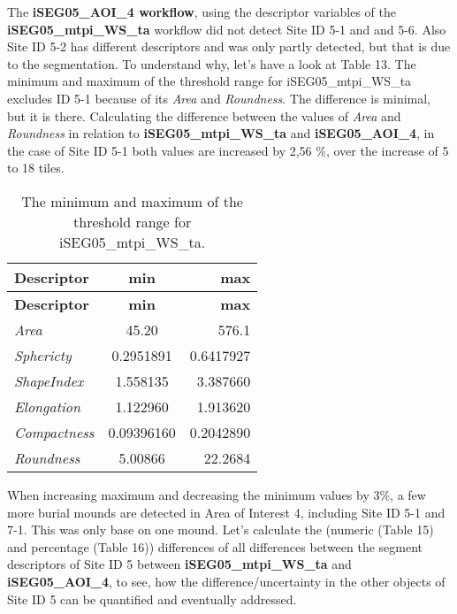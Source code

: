 \documentclass[
  12pt,
]{article}
\begin{document}
The \textbf{iSEG05\_AOI\_4 workflow}, using the descriptor variables of the \textbf{iSEG05\_mtpi\_WS\_ta} workflow did not detect Site ID 5-1 and and 5-6. Also Site ID 5-2 has different descriptors and was only partly detected, but that is due to the segmentation. To understand why, let's have a look at Table 13. The minimum and maximum of the threshold range for iSEG05\_mtpi\_WS\_ta excludes ID 5-1 because of its \emph{Area} and \emph{Roundness}. The difference is minimal, but it is there. Calculating the difference between the values of \emph{Area} and \emph{Roundness} in relation to \textbf{iSEG05\_mtpi\_WS\_ta} and \textbf{iSEG05\_AOI\_4}, in the case of Site ID 5-1 both values are increased by 2,56 \%, over the increase of 5 to 18 tiles.

\begin{longtable}[]{@{}lcr@{}}
\caption{The minimum and maximum of the threshold range for iSEG05\_mtpi\_WS\_ta.}\tabularnewline
\toprule
\textbf{Descriptor} & \textbf{min} & \textbf{max} \\
\midrule
\endfirsthead
\toprule
\textbf{Descriptor} & \textbf{min} & \textbf{max} \\
\midrule
\endhead
\emph{Area} & 45.20 & 576.1 \\
\emph{Sphericty} & 0.2951891 & 0.6417927 \\
\emph{ShapeIndex} & 1.558135 & 3.387660 \\
\emph{Elongation} & 1.122960 & 1.913620 \\
\emph{Compactness} & 0.09396160 & 0.2042890 \\
\emph{Roundness } & 5.00866 & 22.2684 \\
\bottomrule
\end{longtable}

When increasing maximum and decreasing the minimum values by 3\%, a few more burial mounds are detected in Area of Interest 4, including Site ID 5-1 and 7-1. This was only base on one mound. Let's calculate the (numeric (Table 15) and percentage (Table 16)) differences of all differences between the segment descriptors of Site ID 5 between \textbf{iSEG05\_mtpi\_WS\_ta} and \textbf{iSEG05\_AOI\_4}, to see, how the difference/uncertainty in the other objects of Site ID 5 can be quantified and eventually addressed.
\end{document}
